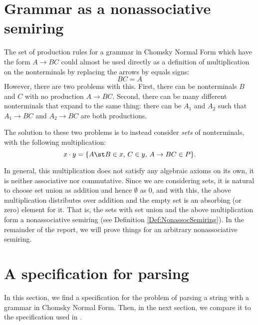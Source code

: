 \section{Grammar as a nonassociative semiring}
\label{Parsing-Algebra}
The set of production rules for a grammar in Chomsky Normal Form which have the form $A \to BC$ could almost be used directly as a definition of multiplication on the nonterminals by replacing the arrows by equals signs:
\begin{equation*}
  BC = A
\end{equation*}
However, there are two problems with this. First, there can be nonterminals $B$ and $C$ with no production $A \to BC$. Second, there can be many different nonterminals that expand to the same thing: there can be $A_1$ and $A_2$ such that $A_1 \to BC$ and $A_2 \to BC$ are both productions.

The solution to these two problems is to instead consider \emph{sets} of nonterminals, with the following multiplication:
\begin{equation*}
  x \cdot y = \{A \st B \in x,\, C \in y,\, A \to BC \in P\}.
\end{equation*}

In general, this multiplication does not satisfy any algebraic axioms on its own, it is neither associative nor commutative.
Since we are considering sets, it is natural to choose set union as addition and hence $\emptyset$ as $0$, and with this, the above multiplication distributes over addition and the empty set is an absorbing (or zero) element for it.
That is, the sets with set union and the above multiplication form a nonassociative semiring (see Definition \ref{Def:NonassocSemiring}). In the remainder of the report, we will prove things for an arbitrary nonassociative semiring.
\section{A specification for parsing}
In this section, we find a specification for the problem of parsing a string with a grammar in Chomsky Normal Form. Then, in the next section, we compare it to the specification used in \citep{Valiant}.

